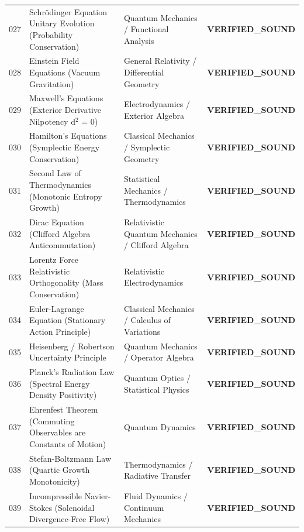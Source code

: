 \documentclass[10pt,a4paper]{article}
\begin{document}
\begin{longtable}{p{0.8cm} p{7.0cm} p{3.8cm} p{3.0cm}}
027 & Schrödinger Equation Unitary Evolution (Probability Conservation) & Quantum Mechanics / Functional Analysis & \textcolor{green!70!black}{\textbf{VERIFIED\_SOUND}} \\
028 & Einstein Field Equations (Vacuum Gravitation) & General Relativity / Differential Geometry & \textcolor{green!70!black}{\textbf{VERIFIED\_SOUND}} \\
029 & Maxwell's Equations (Exterior Derivative Nilpotency d$^2$ = 0) & Electrodynamics / Exterior Algebra & \textcolor{green!70!black}{\textbf{VERIFIED\_SOUND}} \\
030 & Hamilton's Equations (Symplectic Energy Conservation) & Classical Mechanics / Symplectic Geometry & \textcolor{green!70!black}{\textbf{VERIFIED\_SOUND}} \\
031 & Second Law of Thermodynamics (Monotonic Entropy Growth) & Statistical Mechanics / Thermodynamics & \textcolor{green!70!black}{\textbf{VERIFIED\_SOUND}} \\
032 & Dirac Equation (Clifford Algebra Anticommutation) & Relativistic Quantum Mechanics / Clifford Algebra & \textcolor{green!70!black}{\textbf{VERIFIED\_SOUND}} \\
033 & Lorentz Force Relativistic Orthogonality (Mass Conservation) & Relativistic Electrodynamics & \textcolor{green!70!black}{\textbf{VERIFIED\_SOUND}} \\
034 & Euler-Lagrange Equation (Stationary Action Principle) & Classical Mechanics / Calculus of Variations & \textcolor{green!70!black}{\textbf{VERIFIED\_SOUND}} \\
035 & Heisenberg / Robertson Uncertainty Principle & Quantum Mechanics / Operator Algebra & \textcolor{green!70!black}{\textbf{VERIFIED\_SOUND}} \\
036 & Planck's Radiation Law (Spectral Energy Density Positivity) & Quantum Optics / Statistical Physics & \textcolor{green!70!black}{\textbf{VERIFIED\_SOUND}} \\
037 & Ehrenfest Theorem (Commuting Observables are Constants of Motion) & Quantum Dynamics & \textcolor{green!70!black}{\textbf{VERIFIED\_SOUND}} \\
038 & Stefan-Boltzmann Law (Quartic Growth Monotonicity) & Thermodynamics / Radiative Transfer & \textcolor{green!70!black}{\textbf{VERIFIED\_SOUND}} \\
039 & Incompressible Navier-Stokes (Solenoidal Divergence-Free Flow) & Fluid Dynamics / Continuum Mechanics & \textcolor{green!70!black}{\textbf{VERIFIED\_SOUND}} \\

\end{longtable}
\end{document}
